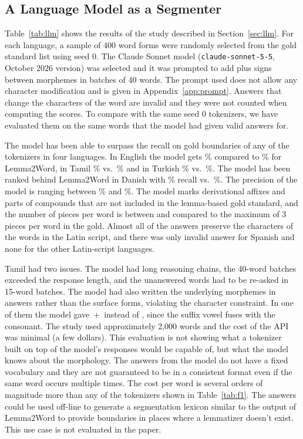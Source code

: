 \subsection{A Language Model as a Segmenter}\label{sec:res-llm}
Table~\ref{tab:llm} shows the results of the study described in Section~\ref{sec:llm}.
For each language, a sample of 400 word forms were randomly selected from the gold standard list using seed 0.
The Claude Sonnet model (\texttt{claude-sonnet-5-5}, October 2026 version) was selected and it was prompted to add plus signs between morphemes in batches of 40 words.
The prompt used does not allow any character modification and is given in Appendix~\ref{app:prompt}.
Answers that change the characters of the word are invalid and they were not counted when computing the scores.
To compare with the same seed 0 tokenizers, we have evaluated them on the same words that the model had given valid answers for.



The model has been able to surpass the recall on gold boundaries of any of the tokenizers in four languages.
In English the model gets \nLlmREnglish\% compared to \nLlmSampleLtwREnglish\% for Lemma2Word, in Tamil \nLlmRTamil\% vs.\ \nLlmSampleLtwRTamil\% and in Turkish \nLlmRTurkish\% vs.\ \nLlmSampleLtwRTurkish\%.
The model has been ranked behind Lemma2Word in Danish with \nLlmRDanish\% recall vs.\ \nLlmSampleLtwRDanish\%.
The precision of the model is ranging between \nLlmPSpanish\% and \nLlmPEnglish\%.
The model marks derivational affixes and parts of compounds that are not included in the lemma-based gold standard, and the number of pieces per word is between \nLlmTpwEnglish{} and \nLlmTpwSpanish{} compared to the maximum of 3 pieces per word in the gold.
Almost all of the answers preserve the characters of the words in the Latin script, and there was only \nLlmInvalidSpanish{} invalid answer for Spanish and none for the other Latin-script languages.

Tamil had two issues.
The model had long reasoning chains, the 40-word batches exceeded the response length, and the unanswered words had to be re-asked in 15-word batches.
The model had also written the underlying morphemes in \nLlmInvalidTamil{} answers rather than the surface forms, violating the character constraint.
In one of them the model gave \,+\, instead of , since the suffix vowel fuses with the consonant.
The study used approximately 2,000 words and the cost of the API was minimal (a few dollars).
This evaluation is not showing what a tokenizer built on top of the model's responses would be capable of, but what the model knows about the morphology.
The answers from the model do not have a fixed vocabulary and they are not guaranteed to be in a consistent format even if the same word occurs multiple times.
The cost per word is several orders of magnitude more than any of the tokenizers shown in Table~\ref{tab:f1}.
The answers could be used off-line to generate a segmentation lexicon similar to the output of Lemma2Word to provide boundaries in places where a lemmatizer doesn't exist.
This use case is not evaluated in the paper.
